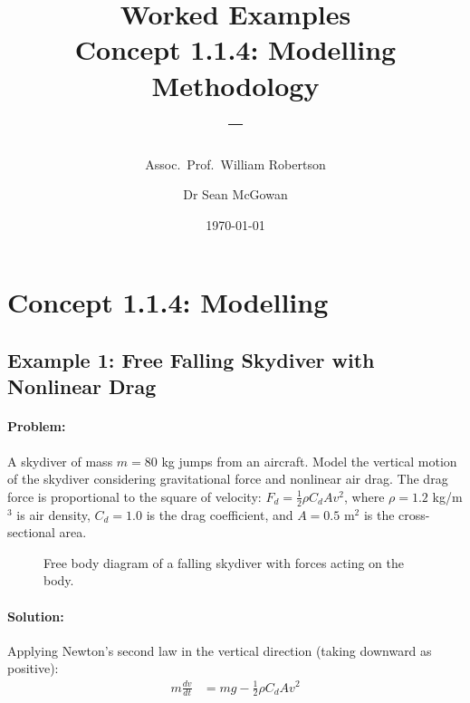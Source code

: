 \documentclass[11pt,a4paper]{article}
\title{\textbf{Worked Examples}\\[0.5em]
\large Concept 1.1.4: Modelling Methodology\\[0.3em]
\normalsize \coursesubtitle{} -- \coursetitle}
\author{Assoc.\ Prof.\ William Robertson \and Dr Sean McGowan}
\date{\today}
\begin{document}
\maketitle
\tableofcontents
\newpage

\section{Concept 1.1.4: Modelling}

\subsection{Example 1: Free Falling Skydiver with Nonlinear Drag}

\paragraph{Problem:} A skydiver of mass $m = 80$ kg jumps from an aircraft. Model the vertical motion of the skydiver considering gravitational force and nonlinear air drag. The drag force is proportional to the square of velocity: $F_d = \frac{1}{2}\rho C_d A v^2$, where $\rho = 1.2$ kg/m$^3$ is air density, $C_d = 1.0$ is the drag coefficient, and $A = 0.5$ m$^2$ is the cross-sectional area.

\begin{figure}[h]
  \centering
  \caption{Free body diagram of a falling skydiver with forces acting on the body.}
\end{figure}

\paragraph{Solution:}

Applying Newton's second law in the vertical direction (taking downward as positive):
\begin{align}
  m\frac{dv}{dt} &= mg - \frac{1}{2}\rho C_d A v^2
\end{align}
\end{document}
